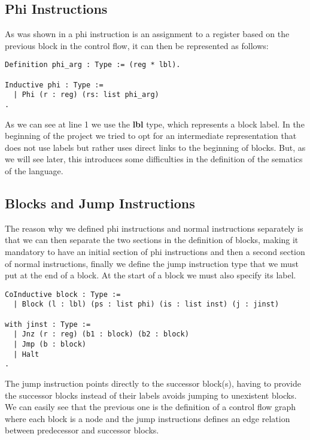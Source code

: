 \subsection{Phi Instructions}
As was shown in  a phi instruction is an assignment to a register based on the previous block in the control flow, it can then be represented as follows:

\begin{lstlisting}[language=Coq]
Definition phi_arg : Type := (reg * lbl).

Inductive phi : Type :=
  | Phi (r : reg) (rs: list phi_arg)
.
\end{lstlisting}

As we can see at line 1 we use the \textbf{lbl} type, which represents a block label. In the beginning of the project we tried to opt for an intermediate representation that does not use labels but rather uses direct links to the beginning of blocks. But, as we will see later, this introduces some difficulties in the definition of the sematics of the language.

\subsection{Blocks and Jump Instructions}

The reason why we defined phi instructions and normal instructions separately is that we can then separate the two sections in the definition of blocks, making it mandatory to have an initial section of phi instructions and then a second section of normal instructions, finally we define the jump instruction type that we must put at the end of a block. At the start of a block we must also specify its label.

\begin{lstlisting}[language=Coq]
CoInductive block : Type :=
  | Block (l : lbl) (ps : list phi) (is : list inst) (j : jinst)

with jinst : Type :=
  | Jnz (r : reg) (b1 : block) (b2 : block)
  | Jmp (b : block)
  | Halt
.
\end{lstlisting}

The jump instruction points directly to the successor block(s), having to provide the successor blocks instead of their labels avoids jumping to unexistent blocks.
We can easily see that the previous one is the definition of a control flow graph where each block is a node and the jump instructions defines an edge relation between predecessor and successor blocks.

